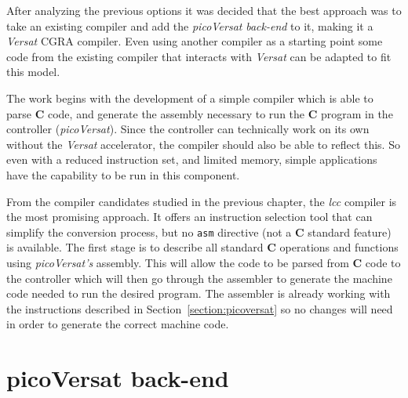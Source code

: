 After analyzing the previous options it was decided that the best approach was
to take an existing compiler and add the {\it picoVersat} {\it back-end} to it, making
it a {\it Versat} {\sc CGRA} compiler.  Even using another compiler as a
starting point some code from the existing compiler that interacts with {\it
  Versat} can be adapted to fit this model.

The work begins with the development of a simple compiler which is able to parse
{\bf C} code, and generate the assembly necessary to run the {\bf C} program in
the controller ({\it picoVersat}).
Since the controller can technically work on its own without the {\it Versat}
accelerator, the compiler should also be able to reflect this.  So even with a
reduced instruction set, and limited memory, simple applications have the
capability to be run in this component.

From the compiler candidates studied in the previous chapter, the {\it lcc}
compiler is the most promising approach.  It offers an instruction selection
tool that can simplify the conversion process, but no {\tt asm} directive
(not a {\bf C} standard feature) is available.
The first stage is to describe all standard
{\bf C} operations and functions using {\it picoVersat's} assembly.  This will
allow the code to be parsed from {\bf C} code to the %
controller which will then go through the assembler to generate the machine code
needed to run the desired program.  The assembler is already working with the
instructions described in Section~\ref{section:picoversat} so no changes will
need in order to generate the correct machine code.

\section{picoVersat back-end}

